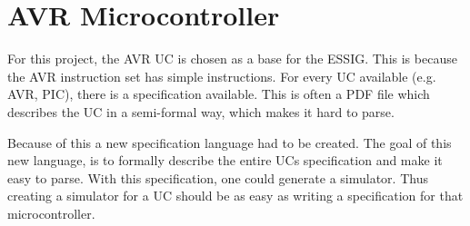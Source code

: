 \chapter{AVR Microcontroller}
For this project, the AVR \ac{UC} is chosen as a base for the \ac{ESSIG}. This
is because the AVR instruction set has simple instructions. For every \ac{UC}
available (e.g. AVR, PIC), there is a specification available. This is often a
PDF file which describes the \ac{UC} in a semi-formal way, which makes it hard
to parse.

Because of this a new specification language had to be created. The goal of
this new language, is to formally describe the entire \ac{UC}s specification
and make it easy to parse. With this specification, one could generate a
simulator. Thus creating a simulator for a \ac{UC} should be as easy as writing
a specification for that microcontroller.
